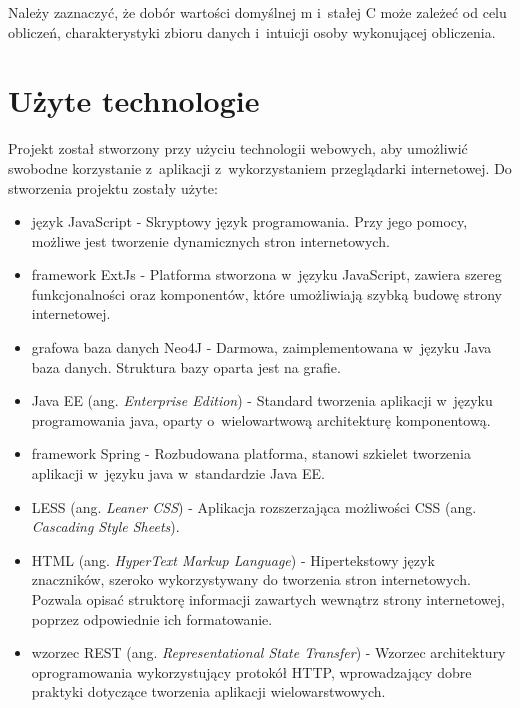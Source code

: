Należy zaznaczyć, że dobór wartości domyślnej m i~stałej C może zależeć od celu obliczeń, charakterystyki zbioru danych i~intuicji osoby wykonującej obliczenia.

\section{Użyte technologie}
Projekt został stworzony przy użyciu technologii webowych, aby umożliwić swobodne korzystanie z~aplikacji z~wykorzystaniem przeglądarki internetowej. Do stworzenia projektu zostały użyte:
\begin{itemize}
\item język JavaScript - Skryptowy język programowania. Przy jego pomocy, możliwe jest tworzenie dynamicznych stron internetowych.\cite{js}
\item framework ExtJs - Platforma stworzona w~języku JavaScript, zawiera szereg funkcjonalności oraz komponentów, które umożliwiają szybką budowę strony internetowej.\cite{extjs}
\item grafowa baza danych Neo4J - Darmowa, zaimplementowana w~języku Java baza danych. Struktura bazy oparta jest na grafie.
\item Java EE (ang. \textit{Enterprise Edition}) - Standard tworzenia aplikacji w~języku programowania java, oparty o~wielowartwową architekturę komponentową.\cite{javaee}
\item framework Spring - Rozbudowana platforma, stanowi szkielet tworzenia aplikacji w~języku java w~standardzie Java EE.\cite{springAction}
\item LESS (ang. \textit{Leaner CSS}) - Aplikacja rozszerzająca możliwości CSS (ang. \textit{Cascading Style Sheets}).\cite{LESS}
\item HTML (ang. \textit{HyperText Markup Language}) - Hipertekstowy język znaczników, szeroko wykorzystywany do tworzenia stron internetowych. Pozwala opisać struktorę informacji zawartych wewnątrz strony internetowej, poprzez odpowiednie ich formatowanie.\cite{html}
\item wzorzec REST (ang. \textit{Representational State Transfer}) - Wzorzec architektury oprogramowania wykorzystujący protokół HTTP, wprowadzający dobre praktyki dotyczące tworzenia aplikacji wielowarstwowych.\cite{restWww}
\end{itemize}
